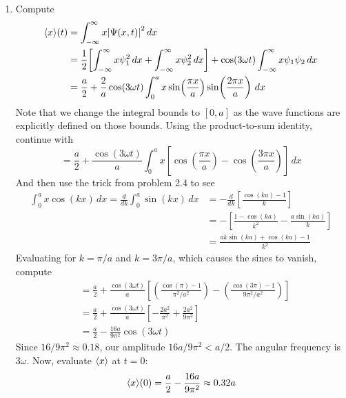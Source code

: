 \documentclass[a4paper]{article}
\begin{document}
\begin{enumerate}[label=(\alph*)]
	\item Compute
	\begin{align*}
		\braket{x}\!\left( t \right) & = \int^{\infty}_{-\infty} x \abs{\Psi \!\left( x,t \right)}^{2} \, dx \\
			   & = \frac{1}{2}\!\left[ \int^{\infty}_{-\infty} x \psi^{2}_{1} \, dx+ \int^{\infty}_{-\infty} x \psi^{2}_{2} \, dx \right] + \cos\!\left(3 \omega t\right)\int^{\infty}_{-\infty} x \psi_{1}\psi_{2} \, dx \\ 
			   & = \frac{a}{2} + \frac{2}{a}\cos\!\left(3 \omega t\right)\int^{a}_{0} x \sin\!\left(\frac{\pi x}{a}\right)\sin\!\left(\frac{2 \pi x}{a}\right) \, dx
	\end{align*}
	Note that we change the integral bounds to \( \!\left[ 0,a \right] \) as the wave functions are explicitly defined on those bounds. Using the product-to-sum identity, continue with
	\[
		 = \frac{a}{2} + \frac{\cos\!\left(3 \omega t\right)}{a}\int^{a}_{0} x \!\left[ \cos\!\left(\frac{\pi x}{a}\right) - \cos\!\left(\frac{3 \pi x}{a}\right) \right] \, dx
	\]
	And then use the trick from problem 2.4 to see
	\begin{align*}
		\int^{a}_{0} x \cos\!\left(kx\right) \, dx = \frac{d }{d k}\int^{a}_{0} \sin\!\left(kx\right) \, dx & = -\frac{d }{d k}\!\left[ \frac{\cos\!\left(ka\right) - 1}{k} \right] \\
							   & = - \!\left[ \frac{1 - \cos\!\left(ka\right)}{k^{2}} - \frac{a \sin\!\left(ka\right)}{k} \right] \\
							   & = \frac{ak \sin\!\left(ka\right) + \cos\!\left(ka\right) - 1}{k^{2}}
	\end{align*}
	Evaluating for \( k = \pi / a \) and \( k = 3 \pi / a \), which causes the sines to vanish, compute
	\begin{align*}
		 & = \frac{a}{2} + \frac{\cos\!\left(3 \omega t\right)}{a}\!\left[ \!\left( \frac{\cos\!\left(\pi\right) - 1}{\pi^{2} / a^{2}} \right) - \!\left( \frac{\cos\!\left(3 \pi\right) - 1}{9 \pi^{2} / a^{2}} \right) \right] \\
		 & = \frac{a}{2} + \frac{\cos\!\left(3 \omega t\right)}{a}\!\left[ -\frac{2a^{2}}{\pi^{2}} + \frac{2a^{2}}{9 \pi^{2}} \right] \\ 
		 & = \frac{a}{2} - \frac{16a}{9 \pi^{2}}\cos\!\left(3 \omega t\right)
	\end{align*}
	Since \( 16 / 9 \pi^{2} \approx 0.18 \), our amplitude \( 16a / 9 \pi^{2} < a/2 \). The angular frequency is \( 3 \omega \). Now, evaluate \( \braket{x} \) at \( t = 0 \):
	\[
		\braket{x}\!\left( 0 \right) = \frac{a}{2} - \frac{16a}{9 \pi^{2}} \approx 0.32a
\]
\end{enumerate}
\end{document}
